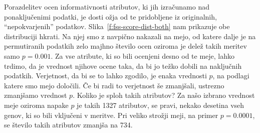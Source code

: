 \begin{figure}[htbp]
\end{figure}

Porazdelitev ocen informativnosti atributov, ki jih izračunamo nad ponaključenimi podatki, je dosti ožja od te pridobljene iz originalnih, ``nepokvarjenih'' podatkov. Slika~\ref{f:fss-score-dist-both} nam prikazuje obe distribuciji hkrati. Na njej smo z navpično nakazali na mejo, od katere dalje je na permutiranih podatkih zelo majhno število ocen oziroma je delež takih meritev samo $p=0.001$. Za vse atribute, ki so bili ocenjeni desno od te meje, lahko trdimo, da je vrednost njihove ocene taka, da bi jo težko dobili na naključnih podatkih. Verjetnost, da bi se to lahko zgodilo, je enaka vrednosti $p$, na podlagi katere smo mejo določili. Če bi radi to verjetnost še zmanjšali, ustrezno zmanjšamo vrednost $p$. Koliko je sploh takih atributov? Za našo izbrano vrednost meje oziroma napake $p$ je takih 1327 atributov, se pravi, nekako desetina vseh genov, ki so bili vključeni v meritve. Pri veliko strožji meji, na primer $p=0.0001$, se število takih atributov zmanjša na 734.

\begin{figure}[htbp]
\end{figure}

